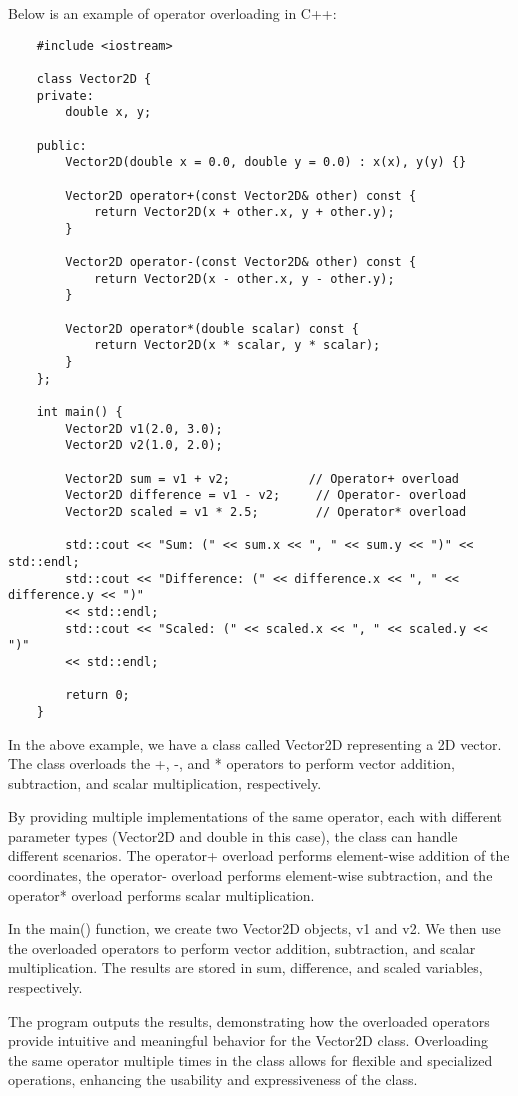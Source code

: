 \begin{solution}
    Below is an example of operator overloading in C++: \\
    \horizontalline
    \begin{verbatim}
    #include <iostream>
    
    class Vector2D {
    private:
        double x, y;
    
    public:
        Vector2D(double x = 0.0, double y = 0.0) : x(x), y(y) {}
    
        Vector2D operator+(const Vector2D& other) const {
            return Vector2D(x + other.x, y + other.y);
        }
    
        Vector2D operator-(const Vector2D& other) const {
            return Vector2D(x - other.x, y - other.y);
        }
    
        Vector2D operator*(double scalar) const {
            return Vector2D(x * scalar, y * scalar);
        }
    };
    
    int main() {
        Vector2D v1(2.0, 3.0);
        Vector2D v2(1.0, 2.0);
    
        Vector2D sum = v1 + v2;           // Operator+ overload
        Vector2D difference = v1 - v2;     // Operator- overload
        Vector2D scaled = v1 * 2.5;        // Operator* overload
    
        std::cout << "Sum: (" << sum.x << ", " << sum.y << ")" << std::endl;
        std::cout << "Difference: (" << difference.x << ", " << difference.y << ")" 
        << std::endl;
        std::cout << "Scaled: (" << scaled.x << ", " << scaled.y << ")" 
        << std::endl;
    
        return 0;
    }
    \end{verbatim}
    
    \horizontalline

    In the above example, we have a class called Vector2D representing a 2D vector. The class overloads the +, -, and * operators to perform vector addition, subtraction, and scalar multiplication, respectively.

    \noindent By providing multiple implementations of the same operator, each with different parameter types (Vector2D and double in this case), the class can handle different scenarios. The operator+ overload performs element-wise addition of the coordinates, the operator- overload performs element-wise subtraction, 
    and the operator* overload performs scalar multiplication.

    \noindent In the main() function, we create two Vector2D objects, v1 and v2. We then use the overloaded operators to perform vector addition, subtraction, and scalar multiplication. The results are stored in sum, difference, and scaled variables, respectively.

    \noindent The program outputs the results, demonstrating how the overloaded operators provide intuitive and meaningful behavior for the Vector2D class. Overloading the same operator multiple times in the class allows for flexible and specialized operations, enhancing the usability and expressiveness of the class.
\end{solution}

